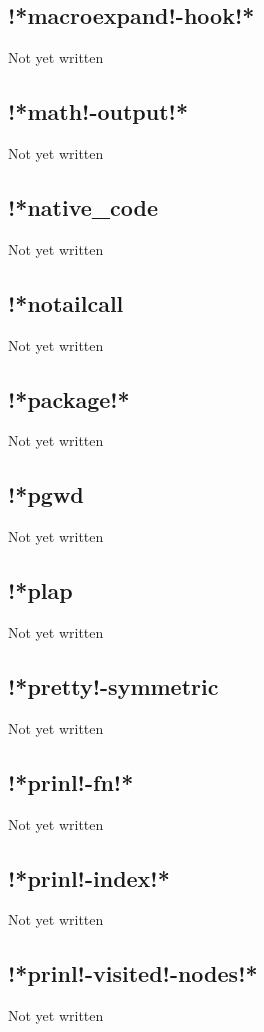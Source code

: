 \documentclass[a4paper,11pt]{article}
\begin{document}
\subsection{\ttfamily !*macroexpand!-hook!*}
Not yet written

\subsection{\ttfamily !*math!-output!*}
Not yet written

\subsection{\ttfamily !*native\_code}
Not yet written

\subsection{\ttfamily !*notailcall}
Not yet written

\subsection{\ttfamily !*package!*}
Not yet written

\subsection{\ttfamily !*pgwd}
Not yet written

\subsection{\ttfamily !*plap}
Not yet written

\subsection{\ttfamily !*pretty!-symmetric}
Not yet written

\subsection{\ttfamily !*prinl!-fn!*}
Not yet written

\subsection{\ttfamily !*prinl!-index!*}
Not yet written

\subsection{\ttfamily !*prinl!-visited!-nodes!*}
Not yet written
\end{document}
